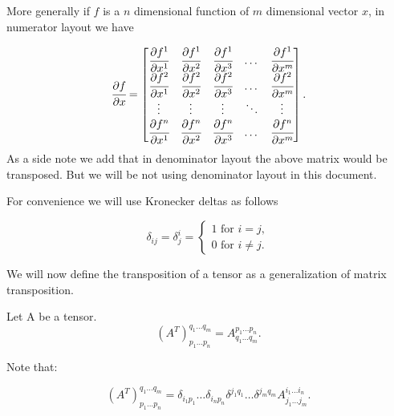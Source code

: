 \documentclass[main.tex]{subfiles}
\begin{document}
More generally if $f$ is a $n$ dimensional function of $m$ dimensional vector $x$, in numerator layout we have

\begin{equation}
\cfrac{\partial f}{\partial x} = \begin{bmatrix}
    \cfrac{\partial f^1}{\partial x^1} & \cfrac{\partial f^1}{\partial x^2} & \cfrac{\partial f^1}{\partial x^3} & \dots  & \cfrac{\partial f^1}{\partial x^m} \\
    \cfrac{\partial f^2}{\partial x^1} & \cfrac{\partial f^2}{\partial x^2} & \cfrac{\partial f^2}{\partial x^3} & \dots  & \cfrac{\partial f^2}{\partial x^m} \\
    
    \vdots & \vdots & \vdots & \ddots & \vdots \\
    \cfrac{\partial f^n}{\partial x^1} & \cfrac{\partial f^n}{\partial x^2} & \cfrac{\partial f^n}{\partial x^3} & \dots  & \cfrac{\partial f^n}{\partial x^m} \\
\end{bmatrix}.
\end{equation}
As a side note we add that in denominator layout the above matrix would be transposed. But we will be not using denominator layout in this document.

For convenience we will use Kronecker deltas as follows

\begin{equation}
    \delta_{ij} = \delta^i_j =
    \begin{cases}
      1 \text{ for } i = j,\\
      0 \text{ for } i \not= j.
    \end{cases}
\end{equation}

We will now define the transposition of a tensor as a generalization of matrix transposition.

\begin{definition}
Let A be a tensor.
\begin{equation}
(A^T)^{q_1\dots q_m}_{p_1\dots p_n} =
A^{p_1\dots p_n}_{q_1\dots q_m}.
\end{equation}

Note that:


\begin{equation}
(A^T)^{q_1\dots q_m}_{p_1\dots p_n} =
\delta_{i_1 p_1} \dots \delta_{i_n p_n} \delta^{j_1 q_1} \dots \delta^{j_m q_m} A^{i_1\dots i_n}_{j_1\dots j_m}.
\end{equation}
\end{definition}
\end{document}
